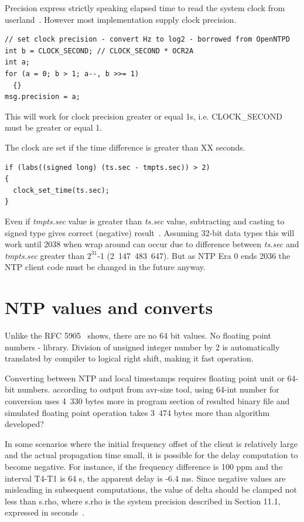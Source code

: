 Precision express strictly speaking elapsed time to read the system clock from userland~\cite{ntp-arch}.
However most implementation supply clock precision.
\begin{lstlisting}
// set clock precision - convert Hz to log2 - borrowed from OpenNTPD
int b = CLOCK_SECOND; // CLOCK_SECOND * OCR2A
int a;
for (a = 0; b > 1; a--, b >>= 1)
  {}
msg.precision = a;
\end{lstlisting}
This will work for clock precision greater or equal 1s, i.e. CLOCK\_SECOND must be greater or equal 1.

The clock are set if the time difference is greater than XX seconds. %
\begin{lstlisting}
if (labs((signed long) (ts.sec - tmpts.sec)) > 2)
{
  clock_set_time(ts.sec);
}
\end{lstlisting}
Even if {\it{tmpts.sec}} value is greater than {\it{ts.sec}} value,
subtracting and casting to signed type gives correct (negative) result~\cite{c99}.
Assuming 32-bit data types this will work until 2038 when wrap around can occur due to difference
between {\it{ts.sec}} and {\it{tmpts.sec}} greater than $2^{31}$-1 (2~147~483~647).
But as NTP Era 0 ends 2036 the NTP client code must be changed in the future anyway.



\section{NTP values and converts}
Unlike the RFC 5905~\cite{rfc5905} shows, there are no 64 bit values. %
No floating point numbers - library.
Division of unsigned integer number by 2 is automatically translated by compiler to logical right shift,
making it fast operation.

Converting between NTP and local timestamps requires floating point unit or 64-bit numbers.
according to output from avr-size tool, using 64-int number for conversion
uses 4~330 bytes more in program section of resulted binary file 
and simulated floating point operation takes 3~474 bytes more
than algorithm developed?

%
In some scenarios where the initial frequency offset of the client is
  relatively large and the actual propagation time small, it is
   possible for the delay computation to become negative.  For instance,
   if the frequency difference is 100 ppm and the interval T4-T1 is 64
   s, the apparent delay is -6.4 ms.  Since negative values are
   misleading in subsequent computations, the value of delta should be
   clamped not less than s.rho, where s.rho is the system precision
   described in Section 11.1, expressed in seconds~.
%

